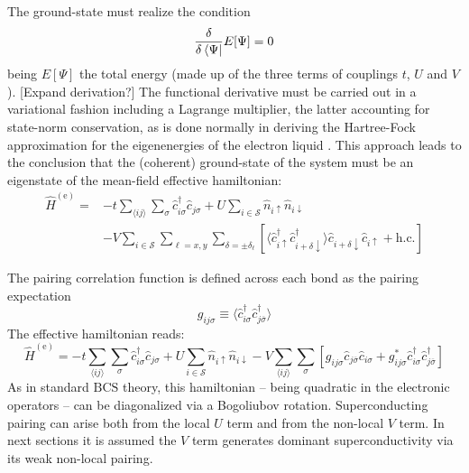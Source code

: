 The ground-state must realize the condition
\[
	\fdv{}{\bra{\Psi}} E[\Psi] = 0
\]
being $E[\Psi]$ the total energy (made up of the three terms of couplings $t$, $U$ and $V$). {\color{tabred}[Expand derivation?]} The functional derivative must be carried out in a variational fashion including a Lagrange multiplier, the latter accounting for state-norm conservation, as is done normally in deriving the Hartree-Fock approximation for the eigenenergies of the electron liquid \cite{grosso2014solid, giuliani2005quantum}. This approach leads to the conclusion that the (coherent) ground-state of the system must be an eigenstate of the mean-field effective hamiltonian:
\begin{equation}\label{eq:extended-hubbard-model-effective-intermediate}
	\begin{aligned}
		\hat H^{(\mathrm{e})} =
		&-t \sum_{\langle ij \rangle} \sum_\sigma \hat c_{i\sigma}^\dagger \hat c_{j\sigma}
		+ U \sum_{i \in \mathcal{S}} \hat n_{i\uparrow} \hat n_{i\downarrow} \\
		&- V \sum_{i \in \mathcal{S}} \sum_{\ell = x,y} \sum_{\delta = \pm \delta_\ell} \left[
			\langle 
				\hat c_{i\uparrow}^\dagger \hat c_{i + \delta \downarrow}^\dagger
			\rangle
			\hat c_{i + \delta \downarrow} \hat c_{i\uparrow} 
			+ \mathrm{h}.\mathrm{c}.
		\right]
	\end{aligned}
\end{equation}

The pairing correlation function is defined across each bond as the pairing expectation
\[
	g_{ij\sigma} \equiv \langle 
		\hat c_{i\sigma}^\dagger \hat c_{j \overline{\sigma}}^\dagger
	\rangle
\]
The effective hamiltonian reads:
\begin{equation}\label{eq:extended-hubbard-model-effective-intermediate-2}
	\hat H^{(\mathrm{e})} =
	-t \sum_{\langle ij \rangle} \sum_\sigma \hat c_{i\sigma}^\dagger \hat c_{j\sigma}
	+ U \sum_{i \in \mathcal{S}} \hat n_{i\uparrow} \hat n_{i\downarrow}
	- V \sum_{\langle ij \rangle} \sum_\sigma \left[
		g_{ij\sigma} \hat c_{j\overline{\sigma}} \hat c_{i\sigma} + g_{ij\sigma}^* \hat c_{i\sigma}^\dagger \hat c_{j\overline{\sigma}}^\dagger
	\right]
\end{equation}
As in standard $\mathrm{BCS}$ theory, this hamiltonian -- being quadratic in the electronic operators -- can be diagonalized via a Bogoliubov rotation. Superconducting pairing can arise both from the local $U$ term and from the non-local $V$ term. In next sections it is assumed the $V$ term generates dominant superconductivity via its weak non-local pairing.

